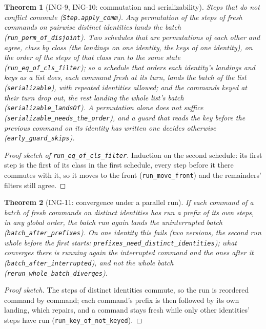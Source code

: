 \documentclass[11pt]{article}
\theoremstyle{plain}
\newtheorem{theorem}{Theorem}[section]
\theoremstyle{definition}
\theoremstyle{remark}
\newcommand{\lean}[1]{\texttt{#1}}
\newcommand{\ing}[1]{ING-#1}
\begin{document}
\begin{theorem}[\ing{9}, \ing{10}: commutation and serializability]
Steps that do not conflict commute (\lean{Step.apply\_comm}). Any permutation of the steps of
fresh commands on pairwise distinct identities lands the batch
(\lean{run\_perm\_of\_disjoint}). Two schedules that are permutations of each other and agree,
class by class (the landings on one identity, the keys of one identity), on the order of the
steps of that class run to the same state (\lean{run\_eq\_of\_cls\_filter}); so a schedule
that orders each identity's landings and keys as a list does, each command fresh at its turn,
lands the batch of the list (\lean{serializable}), with repeated identities allowed; and the
commands keyed at their turn drop out, the rest landing the whole list's batch
(\lean{serializable\_landsOf}). A permutation alone does not suffice
(\lean{serializable\_needs\_the\_order}), and a guard that reads the key before the previous
command on its identity has written one decides otherwise (\lean{early\_guard\_skips}).
\end{theorem}

\begin{proof}[Proof sketch of \lean{run\_eq\_of\_cls\_filter}]
Induction on the second schedule: its first step is the first of its class in the first
schedule, every step before it there commutes with it, so it moves to the front
(\lean{run\_move\_front}) and the remainders' filters still agree.
\end{proof}

\begin{theorem}[\ing{11}: convergence under a parallel run]
If each command of a batch of fresh commands on distinct identities has run a prefix of its own
steps, in any global order, the batch run again lands the uninterrupted batch
(\lean{batch\_after\_prefixes}). On one identity this fails (two versions, the second run whole
before the first starts: \lean{prefixes\_need\_distinct\_identities}); what converges there is
running again the interrupted command and the ones after it
(\lean{batch\_after\_interrupted}), and not the whole batch
(\lean{rerun\_whole\_batch\_diverges}).
\end{theorem}

\begin{proof}[Proof sketch]
The steps of distinct identities commute, so the run is reordered command by command; each
command's prefix is then followed by its own landing, which  repairs, and a
command stays fresh while only other identities' steps have run
(\lean{run\_key\_of\_not\_keyed}).
\end{proof}
\end{document}
